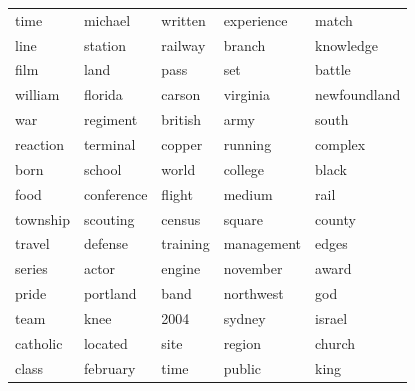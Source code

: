 \begin{table}[ht]
{\begin{tabular}{lllll}
time & michael & written & experience & match \\ 
  line & station & railway & branch & knowledge \\ 
  film & land & pass & set & battle \\ 
  william & florida & carson & virginia & newfoundland \\ 
  war & regiment & british & army & south \\ 
  reaction & terminal & copper & running & complex \\ 
  born & school & world & college & black \\ 
  food & conference & flight & medium & rail \\ 
  township & scouting & census & square & county \\ 
  travel & defense & training & management & edges \\ 
  series & actor & engine & november & award \\ 
  pride & portland & band & northwest & god \\ 
  team & knee & 2004 & sydney & israel \\ 
  catholic & located & site & region & church \\ 
  class & february & time & public & king \\ 
\end{tabular}
}%
\end{table}




